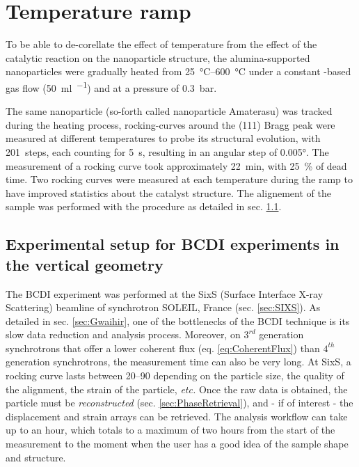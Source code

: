 \section{Temperature ramp}\label{sec:TempRampBCDI}


To be able to de-corellate the effect of temperature from the effect of the catalytic reaction on the nanoparticle structure, the alumina-supported nanoparticles were gradually heated from \qtyrange{25}{600}{\degreeCelsius} under a constant \argon-based gas flow (\qty{50}{\ml\per\min}) and at a pressure of \qty{0.3}{\bar}.

The same nanoparticle (so-forth called nanoparticle Amaterasu) was tracked during the heating process, rocking-curves around the (111) Bragg peak were measured at different temperatures to probe its structural evolution, with \qty{201}{steps}, each counting for \qty{5}{\second}, resulting in an angular step of \ang{0.005}.
The measurement of a rocking curve took approximately \qty{22}{\minute}, with \qty{25}{\percent} of dead time.
Two rocking curves were measured at each temperature during the ramp to have improved statistics about the catalyst structure.
The alignement of the sample was performed with the procedure as detailed in sec. \ref{sec:BCDISetup}.

\subsection{Experimental setup for BCDI experiments in the vertical geometry}\label{sec:BCDISetup}

The BCDI experiment was performed at the SixS (Surface Interface X-ray Scattering) beamline of synchrotron SOLEIL, France (sec. \ref{sec:SIXS}).
As detailed in sec. \ref{sec:Gwaihir}, one of the bottlenecks of the BCDI technique is its slow data reduction and analysis process.
Moreover, on $3^{rd}$ generation synchrotrons that offer a lower coherent flux (eq. \ref{eq:CoherentFlux}) than $4^{th}$ generation synchrotrons, the measurement time can also be very long.
At SixS, a rocking curve lasts between \qtyrange{20}{90}{\min} depending on the particle size, the quality of the alignment, the strain of the particle, \textit{etc.}
Once the raw data is obtained, the particle must be \textit{reconstructed} (sec. \ref{sec:PhaseRetrieval}), and - if of interest - the displacement and strain arrays can be retrieved.
The analysis workflow can take up to an hour, which totals to a maximum of two hours from the start of the measurement to the moment when the user has a good idea of the sample shape and structure.


